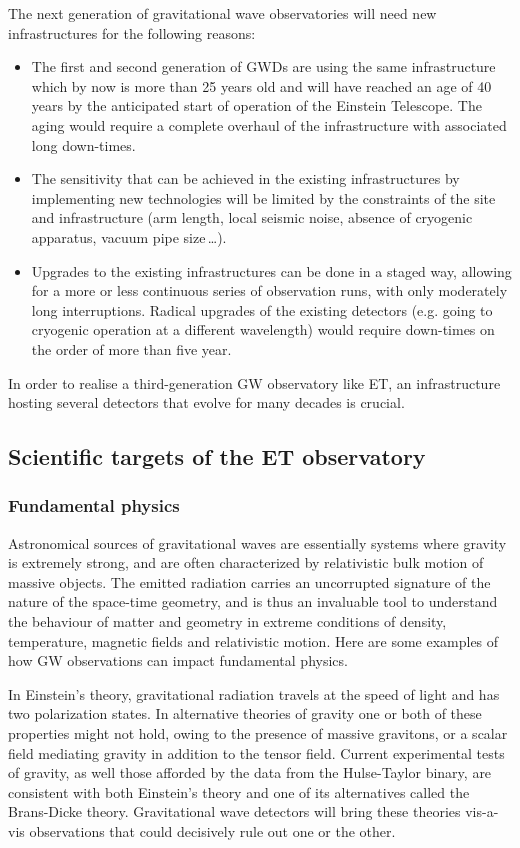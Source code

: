 The next generation of gravitational wave observatories will need new infrastructures for the following reasons:
\begin{itemize}
    \item The first and second generation of GWDs are using the same infrastructure which by now is more than 25 years old and will have reached an age of 40 years by the anticipated start of operation of the Einstein Telescope. The aging would require a complete overhaul of the infrastructure with associated long down-times.
    \item The sensitivity that can be achieved in the existing infrastructures by implementing new technologies will be limited by the constraints of the site and infrastructure (arm length, local seismic noise, absence of cryogenic apparatus, vacuum pipe size\,\ldots).
    \item Upgrades to the existing infrastructures can be done in a staged way, allowing for a more or less continuous series of observation runs, with only moderately long interruptions. Radical upgrades of the existing detectors (e.g. going to cryogenic operation at a different wavelength) would require down-times on the order of more than five year. 
\end{itemize} 
In order to realise a third-generation GW observatory like ET, an infrastructure hosting several detectors that evolve for many decades is crucial.

\clearpage

\subsection{Scientific targets of the ET observatory}
\subsubsection{Fundamental physics}
\label{ScienceCase:FundamentalPhysics}
Astronomical sources of gravitational waves are essentially systems where gravity is extremely strong, and are often characterized by relativistic bulk motion of massive objects. The emitted radiation carries an uncorrupted signature of the nature of the space-time geometry, and is thus an invaluable tool to understand the behaviour of matter and geometry in extreme conditions of density, temperature, magnetic fields and relativistic motion. Here are some examples of how GW observations can impact fundamental physics.

In Einstein's theory, gravitational radiation travels at the speed 
of light and has two polarization states. In alternative theories 
of gravity one or both of these properties might not hold, owing 
to the presence of massive gravitons, or a scalar field mediating 
gravity in addition to the tensor field. Current experimental
tests of gravity, as well those afforded by the data from the
Hulse-Taylor binary, are consistent with both Einstein's theory
and one of its alternatives called the Brans-Dicke theory.
Gravitational wave detectors will bring these theories
vis-a-vis observations that could decisively rule out one
or the other.

